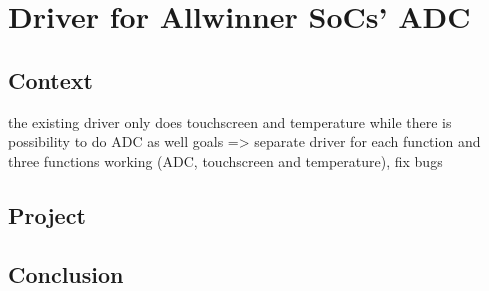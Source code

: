 \chapter{Driver for Allwinner SoCs' ADC}
\section{Context}
the existing driver only does touchscreen and temperature while there is possibility to do ADC as well
goals => separate driver for each function and three functions working (ADC, touchscreen and temperature), fix bugs

\section{Project}

\section{Conclusion}
